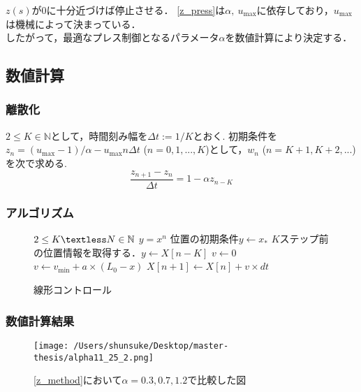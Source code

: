 \documentclass [dvipdfmx] {jsarticle}
\numberwithin{equation}{section}
\theoremstyle{definition} %
\theoremstyle{definition} %
\begin{document}
$z(s)$が$0$に十分近づけば停止させる．
\eqref{z_press}は$\alpha,\ u_{\max}$に依存しており，$u_{\max}$は機械によって決まっている．\\
したがって，最適なプレス制御となるパラメータ$\alpha$を数値計算により決定する．


\subsection{数値計算}


\subsubsection{離散化}
$2\le K\in\mathbb{N}$として，時間刻み幅を$\Delta t:=1/K$とおく.
初期条件を$z_n=(u_{\max}-1)/\alpha-u_{\max} n \Delta t$ ($n=0,1,...,K$)として，$w_n$ ($n=K+1,K+2,...$)
を次で求める.
\begin{equation}\label{z_method}
    \displaystyle\frac{z_{n+1}-z_n}{\Delta t}=1-\alpha z_{n-K}
\end{equation}
\subsubsection{アルゴリズム}
\begin{figure}[h]
    \begin{algorithm}[H]
        \caption{線形コントロール}
        \label{alg1}
        \begin{algorithmic}[1]    
        \REQUIRE $2\le K \textless N\in\mathbb{N}$
        \ENSURE $y = x^n$
        \STATE 位置の初期条件$y \leftarrow x_\ast$
        \ELSE
        \STATE $K$ステップ前の位置情報を取得する．$y \leftarrow X[n-K]$
        \ENDIF
        \STATE $v \leftarrow 0$
        \ELSE
        \STATE $v \leftarrow v_{\min}+a\times(L_0-x)$
        \ENDIF
        \STATE $X[n+1]\leftarrow X[n]+v\times dt$
        \ENDFOR
        \end{algorithmic}
    \end{algorithm}
\end{figure}
\newpage
\subsubsection{数値計算結果}
\begin{figure}[h]
\begin{center}
\texttt{[image: /Users/shunsuke/Desktop/master-thesis/alpha11\_25\_2.png]}
\caption{\eqref{z_method}において$\alpha=0.3,0.7,1.2$で比較した図}
\end{center}
\end{figure}
\end{document}
